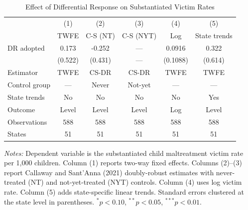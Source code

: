\begin{table}[htbp]
\centering
\begin{threeparttable}
\caption{Effect of Differential Response on Substantiated Victim Rates}
\label{tab:main}
\small
\begin{tabular}{lccccc}
\toprule
 & (1) & (2) & (3) & (4) & (5) \\
 & TWFE & C-S (NT) & C-S (NYT) & Log & State trends \\
\midrule
DR adopted & 0.173 & -0.252 & --- & 0.0916 & 0.322 \\
 & (0.522) & (0.431) & --- & (0.1088) & (0.614) \\
\midrule
Estimator & TWFE & CS-DR & CS-DR & TWFE & TWFE \\
Control group & --- & Never & Not-yet & --- & --- \\
State trends & No & No & No & No & Yes \\
Outcome & Level & Level & Level & Log & Level \\
Observations & 588 & 588 & 588 & 588 & 588 \\
States & 51 & 51 & 51 & 51 & 51 \\
\bottomrule
\end{tabular}
\begin{tablenotes}
\item \textit{Notes:} Dependent variable is the substantiated child maltreatment victim rate per 1,000 children. Column (1) reports two-way fixed effects. Columns (2)--(3) report Callaway and Sant'Anna (2021) doubly-robust estimates with never-treated (NT) and not-yet-treated (NYT) controls. Column (4) uses log victim rate. Column (5) adds state-specific linear trends. Standard errors clustered at the state level in parentheses. $^{*}p<0.10$, $^{**}p<0.05$, $^{***}p<0.01$.
\end{tablenotes}
\end{threeparttable}
\end{table}
